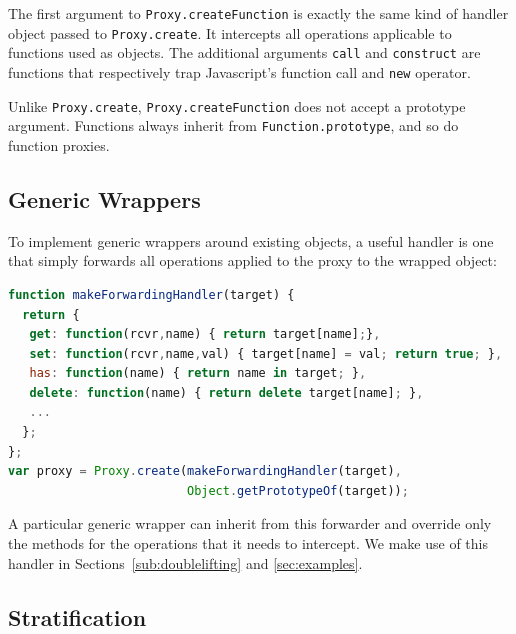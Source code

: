 \documentclass{sig-alternate}
\begin{document}
The first argument to \texttt{Proxy.createFunction} is exactly the same kind of handler object passed to \texttt{Proxy.create}. It intercepts all operations applicable to functions used as objects. The additional arguments \texttt{call} and \texttt{construct} are functions that respectively trap Javascript's function call and \texttt{new} operator.

Unlike \texttt{Proxy.create}, \texttt{Proxy.createFunction} does not accept a prototype argument. Functions always inherit from \texttt{Function.prototype}, and so do function proxies.


\subsection{Generic Wrappers}
\label{sub:wrappers}

To implement generic wrappers around existing objects, a useful handler is one that simply forwards all operations applied to the proxy to the wrapped object:

\begin{lstlisting}[language=javascript]
function makeForwardingHandler(target) {
  return {
   get: function(rcvr,name) { return target[name];},
   set: function(rcvr,name,val) { target[name] = val; return true; },
   has: function(name) { return name in target; },
   delete: function(name) { return delete target[name]; },
   ...
  };
};
var proxy = Proxy.create(makeForwardingHandler(target),
                         Object.getPrototypeOf(target));
\end{lstlisting}

A particular generic wrapper can inherit from this forwarder and override only the methods for the operations that it needs to intercept. We make use of this handler in Sections~\ref{sub:doublelifting} and \ref{sec:examples}.

\subsection{Stratification}
\label{sub:stratification}
\end{document}
